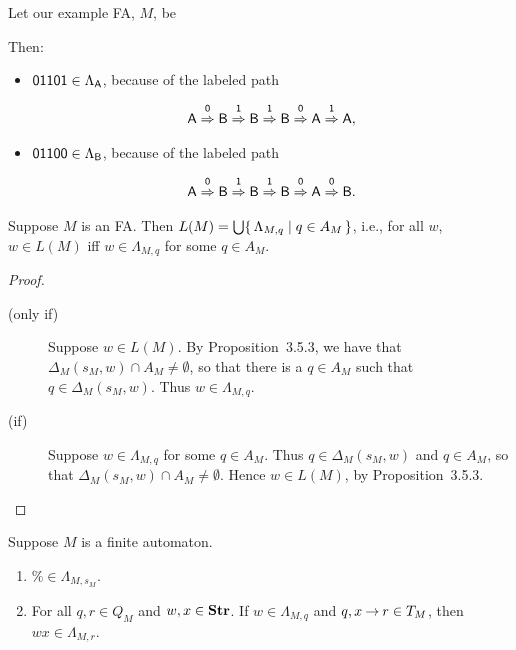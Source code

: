 Let our example FA, $M$, be
\begin{center}

\end{center}
Then:
\begin{itemize}
\item $\mathsf{01101}\in\Lambda_{\mathsf{A}}$, because of the labeled path
  \begin{gather*}
    \mathsf{A\stackrel{\strut0}{\Rightarrow}B\stackrel{\strut1}{\Rightarrow}B\stackrel{\strut1}{\Rightarrow}B\stackrel{\strut0}{\Rightarrow}A\stackrel{\strut1}{\Rightarrow}A} ,
  \end{gather*}

\item $\mathsf{01100}\in\Lambda_{\mathsf{B}}$, because of the labeled path
  \begin{gather*}
    \mathsf{A\stackrel{\strut0}{\Rightarrow}B\stackrel{\strut1}{\Rightarrow}B\stackrel{\strut1}{\Rightarrow}B\stackrel{\strut0}{\Rightarrow}A\stackrel{\strut0}{\Rightarrow}B} .
  \end{gather*}
\end{itemize}

\begin{proposition}
\label{LambdaProp1}
Suppose $M$ is an FA.  Then $L(M) = \bigcup\{ \, \Lambda_{M,q} \mid q\in
  A_M \, \}$, i.e., for all $w$, $w\in L(M)$ iff $w\in\Lambda_{M,q}$ for
some $q\in A_M$.
\end{proposition}

\begin{proof}
\begin{description}
\item[\quad(only if)] Suppose $w\in L(M)$.  By Proposition~3.5.3,
we have that $\Delta_M({s_M},w)\cap A_M\neq\emptyset$, so that there
is a $q\in A_M$ such that $q\in\Delta_M({s_M},w)$.  Thus
$w\in\Lambda_{M,q}$.

\item[\quad(if)] Suppose $w\in\Lambda_{M,q}$ for some $q\in A_M$.
Thus $q\in\Delta_M({s_M},w)$ and $q\in A_M$, so that
$\Delta_M({s_M},w)\cap A_M\neq\emptyset$.  Hence $w\in L(M)$, by
Proposition~3.5.3.
\end{description}
\end{proof}

\begin{proposition}
\label{LambdaProp2}
Suppose $M$ is a finite automaton.
\begin{enumerate}[\quad(1)]
\item $\%\in\Lambda_{M,s_M}$.

\item For all $q,r\in Q_M$ and $w,x\in\mathbf{Str}$.  If $w\in\Lambda_{M,q}$
  and ${q,x\mathbin{\to} r}\in T_M$, then $wx\in\Lambda_{M,r}$.
\end{enumerate}
\end{proposition}

